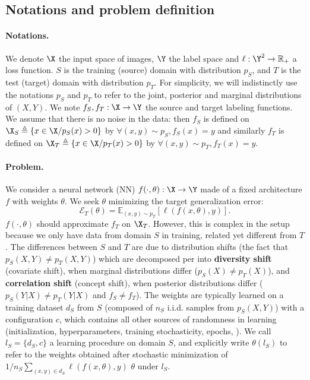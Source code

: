 \subsection{Notations and problem definition}%
\label{subsec:notations}
\paragraph{Notations.}%
We denote $\X$ the input space of images, $\Y$ the label space
and $\ell:\Y^2 \rightarrow \mathbb{R}_+$ a loss function.
$S$ is the training (source) domain with distribution $p_S$, and $T$ is the test (target) domain with distribution $p_T$.
For simplicity, we will indistinctly use the notations $p_S$ and $p_T$ to refer to the joint, posterior and marginal distributions of $(X, Y)$.
We note $f_S, f_T:\X\rightarrow\Y$ the source and target labeling functions.
We assume that there is no noise in the data: then $f_S$ is defined on $\X_S \triangleq \{x\in \X / p_S(x)>0\}$ by $\forall (x, y) \sim p_S,f_S(x)=y$ and similarly $f_T$ is defined on $\X_T \triangleq \{x\in \X / p_T(x)>0\}$ by $\forall (x, y) \sim p_T, f_T(x)=y$.%
\paragraph{Problem.}
We consider a neural network (NN) $f(\cdot, \theta):\X\rightarrow\Y$ made of a fixed architecture $f$ with weights $\theta$.
We seek $\theta$ minimizing the target generalization error:
\begin{equation} \label{eq:gen_error}
    \mathcal{E}_T(\theta)= \mathbb{E}_{(x,y) \sim p_T}[\ell(f(x, \theta),y)].
\end{equation}
$f(\cdot, \theta)$ should approximate $f_T$ on $\X_T$. However, this is complex in the \ood setup because we only have data from domain $S$ in training, related yet different from $T$.
The differences between $S$ and $T$ are due to distribution shifts (\ie the fact that
$p_S(X,Y) \neq p_T(X,Y)$) which are decomposed per \cite{ye2021odbench} into
\textbf{diversity shift} (\aka covariate shift), when marginal distributions differ (\ie $p_S(X) \neq p_T(X)$), and
\textbf{correlation shift} (\aka concept shift), when posterior distributions differ (\ie $p_S(Y|X) \neq p_T(Y|X)$ and $f_S \neq f_T$).
The weights are typically learned on a training dataset $d_S$ from $S$ (composed of $n_S$ i.i.d. samples from $p_S(X,Y)$) with a configuration $c$, which contains all other sources of randomness in learning (\eg initialization, hyperparameters, training stochasticity, epochs, \etc). %
We call $l_S=\{d_S, c\}$ a learning procedure on domain $S$, and explicitly write $\theta(l_S)$ to refer to the weights obtained after stochastic minimization of $1/n_S \sum_{(x,y)\in d_S} \ell(f(x, \theta), y)$ \wrt $\theta$ under $l_S$.
